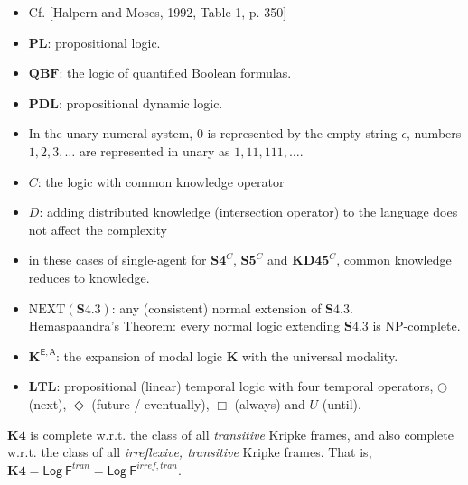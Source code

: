 \documentclass[a4paper,12pt,landscape]{article}
\begin{document}
\begin{table}[htp!]
\begin{itemize}
    \item Cf. [Halpern and Moses, 1992, Table 1, p. 350]
    

    \item $\mathbf{PL}$: propositional logic. 


    \item $\mathbf{QBF}$: the logic of quantified Boolean formulas. 
    

    \item $\mathbf{PDL}$: propositional dynamic logic. 
    
    \item In the unary numeral system, $0$ is represented by the empty string $\epsilon$, numbers $1,2,3,\dots$ are represented in unary as $1, 11, 111, \dots$.

    \item $C$: the logic with common knowledge operator
    \item $D$: adding distributed knowledge (intersection operator) to the language does not affect the complexity
    
    \item  in these cases of single-agent for $\mathbf{S4}^C$, $\mathbf{S5}^C$ and $\mathbf{KD45}^C$, 
     common knowledge reduces to knowledge. 

     \item 
     $\mathrm{NEXT}(\mathbf{S4.3})$: any (consistent) normal extension of $\mathbf{S4.3}$. \\
     \textsf{Hemaspaandra's Theorem}: every normal logic extending $\mathbf{S4.3}$ is NP-complete.

     \item 
     $\mathbf{K}^{\mathsf{E,A}}$: 
     the expansion of modal logic $\mathbf{K}$ with the universal modality.
     
    \item 
    $\mathbf{LTL}$: propositional (linear) temporal logic with four temporal operators, 
    $\bigcirc$ (next), $\Diamond$ (future / eventually), $\Box$ (always) and $U$ (until).
\end{itemize}




\end{table}




\vspace{3em}



$\mathbf{K4}$ is complete w.r.t. the class of all \textit{transitive} Kripke frames, 
and also complete w.r.t. the class of all {\color{purple} \textit{irreflexive, transitive}} Kripke frames. 
That is, 
$\mathbf{K4} = \mathsf{Log}~\mathsf{F}^{tran} = \mathsf{Log}~\mathsf{F}^{irref,tran}$.
\end{document}
